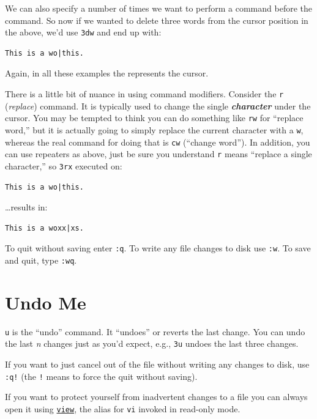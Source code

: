 \documentclass[10pt,]{book}
\numberwithin{figure}{chapter}
\begin{document}
We can also specify a number of times we want to perform a command
before the command. So now if we wanted to delete three words from the
cursor position in the above, we'd use \texttt{3dw} and end up with:

\begin{verbatim}
This is a wo|this.
\end{verbatim}

Again, in all these examples the \texttt{\textbar{}} represents the
cursor.

There is a little bit of nuance in using command modifiers. Consider the
\texttt{r} (\emph{replace}) command. It is typically used to change the
single \textbf{\emph{character}} under the cursor. You may be tempted to
think you can do something like \texttt{rw} for ``replace word,'' but it
is actually going to simply replace the current character with a
\texttt{w}, whereas the real command for doing that is \texttt{cw}
(``change word''). In addition, you can use repeaters as above, just be
sure you understand \texttt{r} means ``replace a single character,'' so
\texttt{3rx} executed on:

\begin{verbatim}
This is a wo|this.
\end{verbatim}

\ldots{}results in:

\begin{verbatim}
This is a woxx|xs.
\end{verbatim}

To quit without saving enter \texttt{:q}. To write any file changes to
disk use \texttt{:w}. To save and quit, type \texttt{:wq}.

\section{Undo Me}\label{undo-me}

\texttt{u} is the ``undo'' command. It ``undoes'' or reverts the last
change. You can undo the last \emph{n} changes just as you'd expect,
e.g., \texttt{3u} undoes the last three changes.

If you want to just cancel out of the file without writing any changes
to disk, use \texttt{:q!} (the \texttt{!} means to force the quit
without saving).

If you want to protect yourself from inadvertent changes to a file you
can always open it using
\href{http://linux.die.net/man/1/view}{\texttt{view}}, the alias for
\texttt{vi} invoked in read-only mode.
\end{document}
